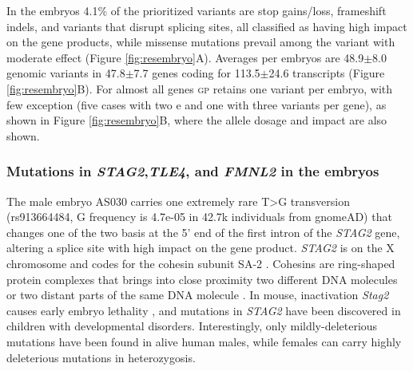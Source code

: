 \documentclass[fleqn,10pt]{wlscirep}
\newcommand{\gp}[]{\textsc{gp }}
\begin{document}
In the embryos 4.1\% of the prioritized variants are stop gains/loss, frameshift indels, and variants that disrupt splicing sites, all classified as having high impact on the gene products, while missense mutations prevail among the variant with moderate effect (Figure \ref{fig:resembryo}A). Averages per embryos are 48.9$\pm$8.0 genomic variants in 47.8$\pm$7.7 genes coding for 113.5$\pm$24.6 transcripts (Figure \ref{fig:resembryo}B). For almost all genes \gp retains one variant per embryo, with few exception (five cases with two e and one with three variants per gene), as shown in Figure \ref{fig:resembryo}B, where the allele dosage and impact are also shown. %

\subsubsection*{Mutations in \textit{STAG2},\textit{TLE4}, and \textit{FMNL2} in the embryos} 
The male embryo AS030 carries one extremely rare T>G transversion (rs913664484, G frequency is 4.7e-05 in 42.7k individuals from gnomeAD\cite{karczewski2020mutational}) that changes one of the two basis at the 5' end of the first intron of the \textit{STAG2} gene, altering a splice site with high impact on the gene product. \textit{STAG2} is on the X chromosome and codes for the cohesin subunit SA-2 \cite{cuadrado2020specialized}. Cohesins are ring-shaped protein complexes that brings into close proximity two different DNA molecules or two distant parts of the same DNA molecule \cite{mcnicoll2013cohesin}. In mouse, inactivation \textit{Stag2} causes early embryo lethality \cite{de2020essential}, and  mutations in \textit{STAG2} have been discovered in children with developmental disorders\cite{study2015large}. Interestingly, only mildly-deleterious mutations have been found in alive human males, while females can carry highly deleterious mutations in heterozygosis\cite{mullegama2019mutations}. 
\end{document}
